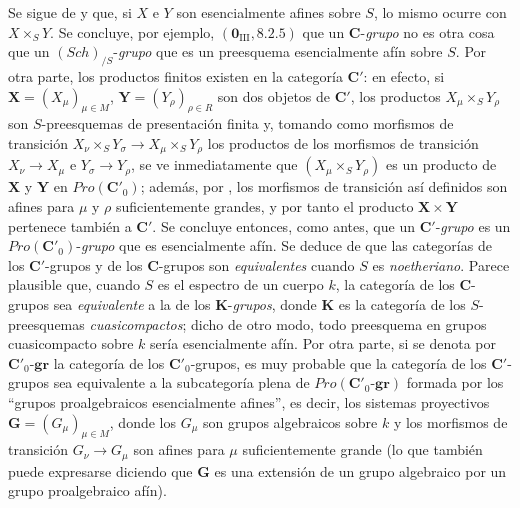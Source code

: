 \begin{remark}[8.13.6]
\label{IV.8.13.6-fr}
Se sigue de  y  que, si $X$ e $Y$ son esencialmente afines sobre $S$, lo mismo ocurre con $X\times_S Y$.
Se concluye, por ejemplo, $(\mathbf 0_{\mathrm{III}},8.2.5)$ que un $\boldsymbol{C}$-\emph{grupo} no es otra cosa que un $(\boldsymbol{\mathit{Sch}})_{/S}$-\emph{grupo} que es un preesquema esencialmente afín sobre $S$.
Por otra parte, los productos finitos existen en la categoría $\boldsymbol{C}'$: en efecto, si $\mathbf X=(X_\mu)_{\mu\in M}$, $\mathbf Y=(Y_\rho)_{\rho\in R}$ son dos objetos de $\boldsymbol{C}'$, los productos $X_\mu\times_S Y_\rho$ son $S$-preesquemas de presentación finita y, tomando como morfismos de transición $X_\nu\times_S Y_\sigma\longrightarrow X_\mu\times_S Y_\rho$ los productos de los morfismos de transición $X_\nu\to X_\mu$ e $Y_\sigma\to Y_\rho$, se ve inmediatamente que $(X_\mu\times_S Y_\rho)$ es un producto de $\mathbf X$ y $\mathbf Y$ en $\boldsymbol{\mathit{Pro}}(\boldsymbol{C}'_0)$; además, por , los morfismos de transición así definidos son afines para $\mu$ y $\rho$ suficientemente grandes, y por tanto el producto $\mathbf X\times\mathbf Y$ pertenece también a $\boldsymbol{C}'$.
Se concluye entonces, como antes, que un $\boldsymbol{C}'$-\emph{grupo} es un $\boldsymbol{\mathit{Pro}}(\boldsymbol{C}'_0)$-\emph{grupo} que es esencialmente afín.
Se deduce de  que las categorías de los $\boldsymbol{C}'$-grupos y de los $\boldsymbol{C}$-grupos son \emph{equivalentes} cuando $S$ es \emph{noetheriano}.
Parece plausible que, cuando $S$ es el espectro de un cuerpo $k$, la categoría de los $\boldsymbol{C}$-grupos sea \emph{equivalente} a la de los $\boldsymbol K$-\emph{grupos}, donde $\boldsymbol K$ es la categoría de los $S$-preesquemas \emph{cuasicompactos}; dicho de otro modo, todo preesquema en grupos cuasicompacto sobre $k$ sería esencialmente afín.
Por otra parte, si se denota
por $\boldsymbol{C}'_0$-$\boldsymbol{gr}$ la categoría de los $\boldsymbol{C}'_0$-grupos, es muy probable que la categoría de los $\boldsymbol{C}'$-grupos sea equivalente a la subcategoría plena de $\boldsymbol{\mathit{Pro}}(\boldsymbol{C}'_0\text{-}\boldsymbol{gr})$ formada por los ``grupos proalgebraicos esencialmente afines'', es decir, los sistemas proyectivos $\mathbf G=(G_\mu)_{\mu\in M}$, donde los $G_\mu$ son grupos algebraicos sobre $k$ y los morfismos de transición $G_\nu\to G_\mu$ son afines para $\mu$ suficientemente grande (lo que también puede expresarse diciendo que $\mathbf G$ es una extensión de un grupo algebraico por un grupo proalgebraico afín).

\end{remark}

